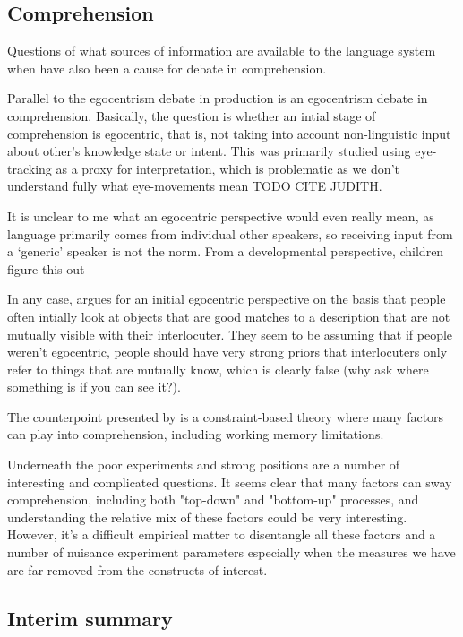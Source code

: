 \documentclass[]{article}
\begin{document}
\subsection{Comprehension}

Questions of what sources of information are available to the language system when have also been a cause for debate in comprehension. 

Parallel to the egocentrism debate in production is an egocentrism debate in comprehension. Basically, the question is whether an intial stage of comprehension is egocentric, that is, not taking into account non-linguistic input about other's knowledge state or intent. This was primarily studied using eye-tracking as a proxy for interpretation, which is problematic as we don't understand fully what eye-movements mean TODO CITE JUDITH. 

It is unclear to me what an egocentric perspective would even really mean, as language primarily comes from individual other speakers, so receiving input from a `generic' speaker is not the norm. From a developmental perspective, children figure this out %

In any case, \cite{keysar2000} argues for an initial egocentric perspective on the basis that people often intially look at objects that are good matches to a description that are not mutually visible with their interlocuter. They seem to be assuming that if people weren't egocentric, people should have very strong priors that interlocuters only refer to things that are mutually know, which is clearly false (why ask where something is if you can see it?). 

The counterpoint presented by \cite{hanna2003} is a constraint-based theory where many factors can play into comprehension, including working memory limitations. 

Underneath the poor experiments and strong positions are a number of interesting and complicated questions. It seems clear that many factors can sway comprehension, including both "top-down" and "bottom-up" processes, and understanding the relative mix of these factors could be very interesting. However, it's a difficult empirical matter to disentangle all these factors and a number of nuisance experiment parameters especially when the measures we have are far removed from the constructs of interest. 





\subsection{Interim summary}
\end{document}
